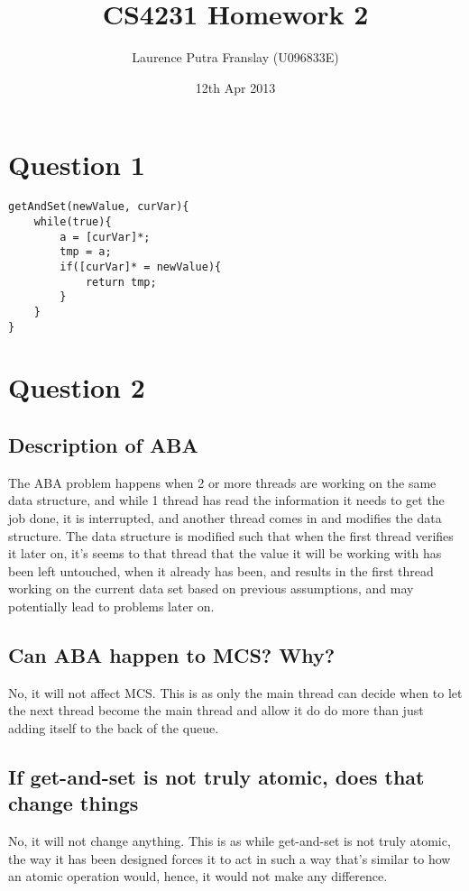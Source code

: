 \documentclass[]{article}
\begin{document}
\title{CS4231 Homework 2}
\author{Laurence Putra Franslay (U096833E)}
\date{12th Apr 2013}
\maketitle

\section{Question 1}
\begin{lstlisting}
getAndSet(newValue, curVar){
	while(true){
		a = [curVar]*;
		tmp = a;
		if([curVar]* = newValue){
			return tmp;
		}
	}
}
\end{lstlisting}

\section{Question 2}
\subsection{Description of ABA}
The ABA problem happens when 2 or more threads are working on the same data structure, and while 1 thread has read the information it needs to get the job done, it is interrupted, and another thread comes in and modifies the data structure. The data structure is modified such that when the first thread verifies it later on, it's seems to that thread that the value it will be working with has been left untouched, when it already has been, and results in the first thread working on the current data set based on previous assumptions, and may potentially lead to problems later on.\\

\subsection{Can ABA happen to MCS? Why?}
No, it will not affect MCS. This is as only the main thread can decide when to let the next thread become the main thread and allow it do do more than just adding itself to the back of the queue. \\

\subsection{If get-and-set is not truly atomic, does that change things}
No, it will not change anything. This is as while get-and-set is not truly atomic, the way it has been designed forces it to act in such a way that's similar to how an atomic operation would, hence, it would not make any difference.\\
\end{document}
